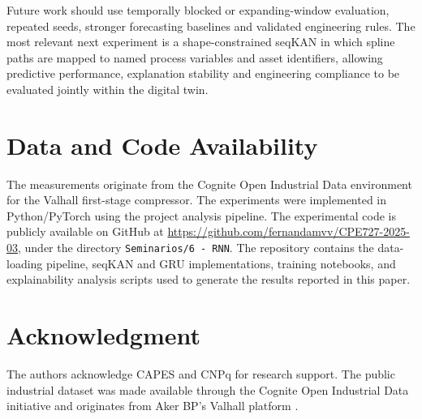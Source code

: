 \documentclass[conference]{IEEEtran}
\begin{document}
Future work should use temporally blocked or expanding-window evaluation, repeated seeds, stronger forecasting baselines and validated engineering rules. The most relevant next experiment is a shape-constrained seqKAN in which spline paths are mapped to named process variables and asset identifiers, allowing predictive performance, explanation stability and engineering compliance to be evaluated jointly within the digital twin.

\section*{Data and Code Availability}
The measurements originate from the Cognite Open Industrial Data environment for the Valhall first-stage compressor. The experiments were implemented in Python/PyTorch using the project analysis pipeline. The experimental code is publicly available on GitHub at \url{https://github.com/fernandamvv/CPE727-2025-03}, under the directory \texttt{Seminarios/6 - RNN}. The repository contains the data-loading pipeline, seqKAN and GRU implementations, training notebooks, and explainability analysis scripts used to generate the results reported in this paper.

\section*{Acknowledgment}
The authors acknowledge CAPES and CNPq for research support. The public industrial dataset was made available through the Cognite Open Industrial Data initiative and originates from Aker BP's Valhall platform \cite{cognite2018}.
\end{document}
